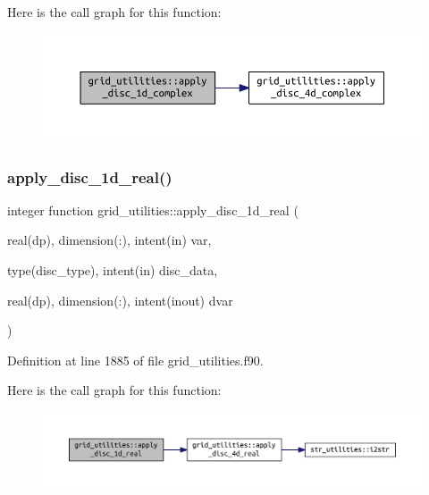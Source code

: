 Here is the call graph for this function\+:
\nopagebreak
\begin{figure}[H]
\begin{center}
\leavevmode
\includegraphics[width=350pt]{namespacegrid__utilities_a948a0ef995a14a7a80464933e8c28029_cgraph}
\end{center}
\end{figure}
\mbox{\label{namespacegrid__utilities_ae57cbda514cf4bf01714e0746ff342a2}} 
\subsubsection{\texorpdfstring{apply\+\_\+disc\+\_\+1d\+\_\+real()}{apply\_disc\_1d\_real()}}
{\footnotesize\ttfamily integer function grid\+\_\+utilities\+::apply\+\_\+disc\+\_\+1d\+\_\+real (\begin{DoxyParamCaption}\item[{real(dp), dimension(\+:), intent(in)}]{var,  }\item[{type(disc\+\_\+type), intent(in)}]{disc\+\_\+data,  }\item[{real(dp), dimension(\+:), intent(inout)}]{dvar }\end{DoxyParamCaption})}



Definition at line 1885 of file grid\+\_\+utilities.\+f90.

Here is the call graph for this function\+:
\nopagebreak
\begin{figure}[H]
\begin{center}
\leavevmode
\includegraphics[width=350pt]{namespacegrid__utilities_ae57cbda514cf4bf01714e0746ff342a2_cgraph}
\end{center}
\end{figure}
\mbox{\label{namespacegrid__utilities_a7cb36e1ff9abd22f7f18d8b65215c67f}} 

